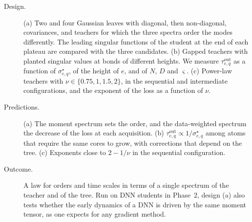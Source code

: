 \documentclass[11pt]{article}
\theoremstyle{definition}
\numberwithin{equation}{section}
\begin{document}
\begin{description}
\item[Design.] (a) Two and four Gaussian leaves with diagonal, then non-diagonal, covariances, and teachers for which the three spectra order the modes differently. The leading singular functions of the student at the end of each plateau are compared with the three candidates. (b) Gapped teachers with planted singular values at bonds of different heights. We measure $\tau^{\mathrm{out}}_{e,q}$ as a function of $\sigma^\star_{e,q}$, of the height of $e$, and of $N$, $D$ and $\varsigma$. (c) Power-law teachers with $\nu\in\{0.75,1,1.5,2\}$, in the sequential and intermediate configurations, and the exponent of the loss as a function of $\nu$.
\item[Predictions.] (a) The moment spectrum sets the order, and the data-weighted spectrum the decrease of the loss at each acquisition. (b) $\tau^{\mathrm{out}}_{e,q}\propto1/\sigma^\star_{e,q}$ among atoms that require the same cores to grow, with corrections that depend on the tree. (c) Exponents close to $2-1/\nu$ in the sequential configuration.
\item[Outcome.] A law for orders and time scales in terms of a single spectrum of the teacher and of the tree. Run on DNN students in Phase~2, design (a) also tests whether the early dynamics of a DNN is driven by the same moment tensor, as one expects for any gradient method.
\end{description}
\end{document}
